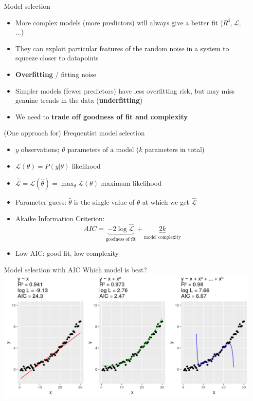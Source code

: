 \documentclass[10pt]{beamer}
\begin{document}
\begin{frame}{Model selection}
  \begin{itemize}
  \item More complex models (more predictors) will always give a better fit ($R^2, \mathcal{L}$, ...)
  \item They can exploit particular features of the random noise in a system to squeeze closer to datapoints
  \item \textbf{Overfitting} / fitting noise
  \item Simpler models (fewer predictors) have less overfitting risk, but may miss genuine trends in the data (\textbf{underfitting})
  \item We need to \textbf{trade off goodness of fit and complexity}
    \end{itemize}
\end{frame}

\begin{frame}{(One approach for) Frequentist model selection}
  \begin{itemize}
  \item $y$ observations; $\theta$ parameters of a model ($k$ parameters in total)
  \item $\mathcal{L}(\theta) = P(y | \theta)$ likelihood
  \item $\hat{\mathcal{L}} = \mathcal{L}(\hat{\theta}) = \max_{\theta} \mathcal{L}(\theta)$ maximum likelihood
        \item Parameter guess: $\hat{\theta}$ is the single value of $\theta$ at which we get $\hat{\mathcal{L}}$

        \item Akaike Information Criterion:
          \begin{equation*}
            AIC = \underbrace{-2 \log \hat{\mathcal{L}}}_{\text{goodness of fit}} + \underbrace{2k}_{\text{model complexity}}
            \end{equation*}
          \item Low AIC: good fit, low complexity
  \end{itemize}
\end{frame}

\begin{frame}{Model selection with AIC}
  Which model is best?
  \includegraphics[width=\textwidth]{cedas-model-4.png}
\end{frame}
\end{document}
